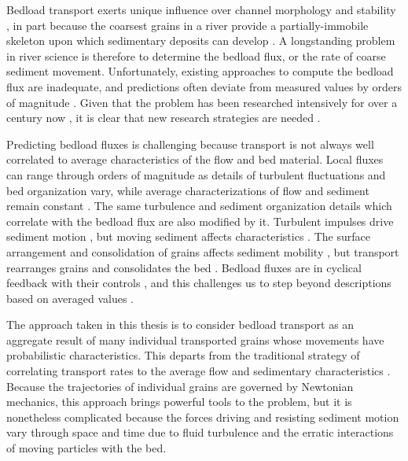 Bedload transport exerts unique influence over channel morphology and stability \citep{Church2006,Recking2016}, in part because the coarsest grains in a river provide a partially-immobile skeleton upon which sedimentary deposits can develop \citep{Hassan2008, Eaton2020}.
A longstanding problem in river science is therefore to determine the bedload flux, or the rate of coarse sediment movement.
Unfortunately, existing approaches to compute the bedload flux are inadequate, and predictions often deviate from measured values by orders of magnitude \citep{Gomez1989, Barry2004, Bathurst2007a, Recking2012}.
Given that the problem has been researched intensively for over a century now \citep{Gilbert1914}, it is clear that new research strategies are needed \DIFdelbegin {}\DIFdelend \DIFaddbegin {}\DIFaddend .

Predicting bedload fluxes is challenging because transport is not always well correlated to average characteristics of the flow and bed material. 
Local fluxes can range through orders of magnitude as details of turbulent fluctuations and bed organization vary, while average characterizations of flow and sediment remain constant \citep{Sumer2003, Charru2004, Hassan2008, Venditti2017}.
The same turbulence and sediment organization details which correlate with the bedload flux are also modified by it.
Turbulent impulses drive sediment motion \citep{Valyrakis2010, Celik2014, Amir2014, Shih2017}, but moving sediment affects \DIFdelbegin {}\DIFdelend \DIFaddbegin {}\DIFaddend characteristics \citep{Singh2010, Santos2014, Liu2016}.
The surface arrangement and consolidation of grains \DIFdelbegin {}\DIFdelend affects sediment mobility \DIFaddbegin {}\DIFaddend , but transport rearranges grains and consolidates the bed \citep{Kirchener1990, Charru2004, Allen2018, Masteller2019, Pretzlav2020}.
Bedload fluxes are in cyclical feedback with their controls \citep{Jerolmack2005}, and this challenges us to step beyond descriptions based on averaged values \citep{Ancey2020b}.

The approach taken in this thesis is to consider bedload transport as an aggregate result of many individual transported grains whose movements have probabilistic characteristics.
This departs from the traditional strategy of correlating transport rates to the average flow and sedimentary characteristics \citep{MeyerPeter1948, Parker1990, Wilcock2001}.
Because the trajectories of individual grains are governed by Newtonian mechanics, this approach brings powerful tools to the problem, but it is nonetheless complicated because the forces driving and resisting sediment motion vary through space and time due to fluid turbulence and the erratic interactions of moving particles with the bed.


